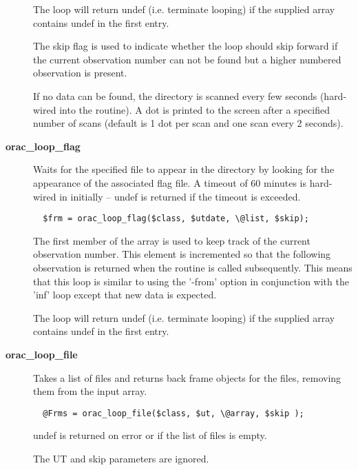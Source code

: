 \begin{description}
The loop will return undef (i.e. terminate looping) if the
supplied array contains undef in the first entry.



The skip flag is used to indicate whether the loop should skip
forward if the current observation number can not be found
but a higher numbered observation is present.



If no data can be found, the directory is scanned every few seconds
(hard-wired into the routine). A dot is printed to the screen after
a specified number of scans (default is 1 dot per scan and one scan every
2 seconds).


\item[{\textbf{orac\_loop\_flag}}] \mbox{}

Waits for the specified file to appear in the directory
by looking for the appearance of the associated flag file.
A timeout of 60 minutes is hard-wired in initially -- undef
is returned if the timeout is exceeded.

\begin{verbatim}
  $frm = orac_loop_flag($class, $utdate, \@list, $skip);
\end{verbatim}


The first member of the array is used to keep track of the
current observation number. This element is incremented so that
the following observation is returned when the routine is called
subsequently. This means that this loop is similar to using the
'-from' option in conjunction with the 'inf' loop except that
new data is expected.



The loop will return undef (i.e. terminate looping) if the
supplied array contains undef in the first entry.


\item[{\textbf{orac\_loop\_file}}] \mbox{}

Takes a list of files and returns back frame objects for the files,
removing them from the input array.

\begin{verbatim}
  @Frms = orac_loop_file($class, $ut, \@array, $skip );
\end{verbatim}


undef is returned on error or if the list of files is empty.



The UT and skip parameters are ignored.




\end{description}
